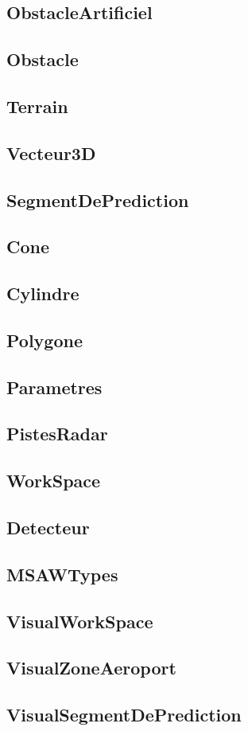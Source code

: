 \documentclass[11pt]{article}
\begin{document}
\subsection{ObstacleArtificiel}

\subsection{Obstacle}

\subsection{Terrain}

\subsection{Vecteur3D}

\subsection{SegmentDePrediction}

\subsection{Cone}

\subsection{Cylindre}

\subsection{Polygone}

\subsection{Parametres}

\subsection{PistesRadar}

\subsection{WorkSpace}

\subsection{Detecteur}

\subsection{MSAWTypes}

\subsection{VisualWorkSpace}

\subsection{VisualZoneAeroport}

\subsection{VisualSegmentDePrediction}


\newpage
{}
\printindex
\end{document}
